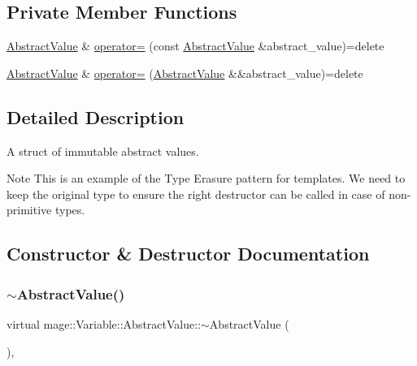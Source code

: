 \subsection*{Private Member Functions}
\begin{DoxyCompactItemize}
\item 
\hyperlink{structmage_1_1_variable_1_1_abstract_value}{Abstract\+Value} \& \hyperlink{structmage_1_1_variable_1_1_abstract_value_a77f7107e78716a0ea76cfaedd0a50a4b}{operator=} (const \hyperlink{structmage_1_1_variable_1_1_abstract_value}{Abstract\+Value} \&abstract\+\_\+value)=delete
\item 
\hyperlink{structmage_1_1_variable_1_1_abstract_value}{Abstract\+Value} \& \hyperlink{structmage_1_1_variable_1_1_abstract_value_a4aac7aa9278054361c478b4b8a457e6e}{operator=} (\hyperlink{structmage_1_1_variable_1_1_abstract_value}{Abstract\+Value} \&\&abstract\+\_\+value)=delete
\end{DoxyCompactItemize}


\subsection{Detailed Description}
A struct of immutable abstract values.

\begin{DoxyNote}{Note}
This is an example of the Type Erasure pattern for templates. We need to keep the original type to ensure the right destructor can be called in case of non-\/primitive types. 
\end{DoxyNote}


\subsection{Constructor \& Destructor Documentation}
\hypertarget{structmage_1_1_variable_1_1_abstract_value_a7fa8fc14f81bb26f239af5f1263888a5}{}\label{structmage_1_1_variable_1_1_abstract_value_a7fa8fc14f81bb26f239af5f1263888a5} 
\subsubsection{\texorpdfstring{$\sim$\+Abstract\+Value()}{~AbstractValue()}}
{\footnotesize\ttfamily virtual mage\+::\+Variable\+::\+Abstract\+Value\+::$\sim$\+Abstract\+Value (\begin{DoxyParamCaption}{ }\end{DoxyParamCaption})\hspace{0.3cm}{\ttfamily [virtual]}, {\ttfamily [default]}}

